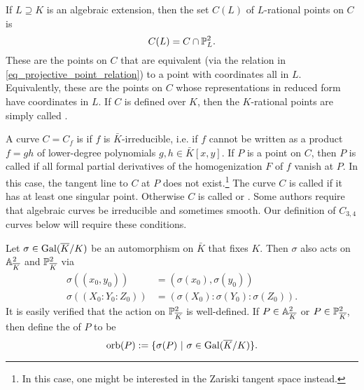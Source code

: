 If $L \supseteq K$ is an algebraic extension, 
then the set $C(L)$ of $L$-rational points on $C$ is
\[ C(L) = C \cap \mathbb{P}_L^2. \]
These are the points on $C$ that are equivalent (via the relation in \ref{eq_projective_point_relation})
to a point with coordinates all in $L$.
Equivalently, these are the points on $C$ whose representations in reduced form have coordinates in $L$.
If $C$ is defined over $K$, then the $K$-rational points are simply called .

A curve $C = C_f$ is  if $f$ is $\bar K$-irreducible,
i.e. if $f$ cannot be written as a product $f = gh$ of lower-degree polynomials $g, h \in \bar K[x,y]$.
If $P$ is a point on $C$,
then $P$ is called  if all formal partial derivatives of the homogenization $F$ of $f$ vanish at $P$.
In this case, the tangent line to $C$ at $P$ does not exist.\footnote{
In this case, one might be interested in the Zariski tangent space instead.}
The curve $C$ is called  if it has at least one singular point.
Otherwise $C$ is called  or .
Some authors require that algebraic curves be irreducible and sometimes smooth.
Our definition of $C_{3,4}$ curves below will require these conditions.

Let $\sigma \in \operatorname{Gal}(\overline K/K)$ be an automorphism on $\bar K$ that fixes $K$.
Then $\sigma$ also acts on $\mathbb{A}_{\overline K}^2$ and $\mathbb{P}_{\overline K}^2$ via
\begin{align}
  \label{eq_galois_action_on_point}
  \sigma((x_0, y_0)) &= (\sigma(x_0), \sigma(y_0)) \\
  \sigma((X_0 : Y_0 : Z_0)) &= (\sigma(X_0) : \sigma(Y_0) : \sigma(Z_0)). \nonumber
\end{align}
It is easily verified that the action on $\mathbb{P}_{\overline K}^2$ is well-defined.
If $P \in \mathbb{A}_{\overline K}^2$ or $P \in \mathbb{P}_{\overline K}^2$,
then define the  of $P$ to be
\[ \operatorname{orb}(P) := \{ \sigma(P) ~|~ \sigma \in \operatorname{Gal}(\overline K/K) \}. \]

